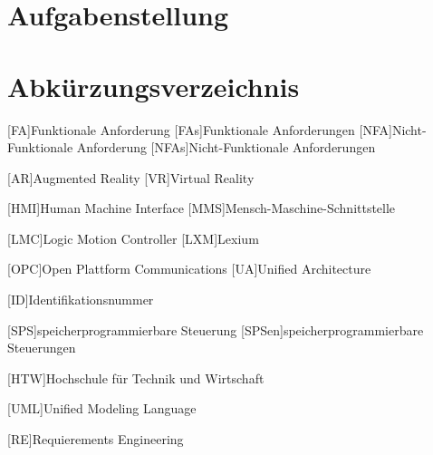 \documentclass[12pt, a4paper, twoside]{article} %
\begin{document}
\section*{Aufgabenstellung}
\clearpage

\listoffigures
\clearpage

\listoftables
\clearpage

\section*{Abkürzungsverzeichnis}
\begin{acronym}[FA]
	[FA]{Funktionale Anforderung}
	[FAs]{Funktionale Anforderungen}
	[NFA]{Nicht-Funktionale Anforderung}
	[NFAs]{Nicht-Funktionale Anforderungen}
\end{acronym}
\begin{acronym}[VR]
	[AR]{Augmented Reality}
	[VR]{Virtual Reality}
\end{acronym}
\begin{acronym}[HMI]
	[HMI]{Human Machine Interface}
	[MMS]{Mensch-Maschine-Schnittstelle}
\end{acronym}
\begin{acronym}[LMC]
	[LMC]{Logic Motion Controller}
	[LXM]{Lexium}
\end{acronym}
\begin{acronym}[OPC]
	[OPC]{Open Plattform Communications}
	[UA]{Unified Architecture}
\end{acronym}
\begin{acronym}[ID]
	[ID]{Identifikationsnummer}
\end{acronym}
\begin{acronym}[SPS]
	[SPS]{speicherprogrammierbare Steuerung}
	[SPSen]{speicherprogrammierbare Steuerungen}
\end{acronym}
\begin{acronym}[HTW]
	[HTW]{Hochschule für Technik und Wirtschaft}
\end{acronym}
\begin{acronym}[UML]
	[UML]{Unified Modeling Language}
\end{acronym}
\begin{acronym}[RE]
	[RE]{Requierements Engineering}
\end{acronym}
\clearpage
\end{document}
